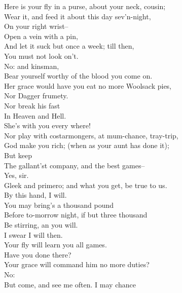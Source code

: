 \documentclass{memoir}
\begin{document}
\begin{drama*}
 Here is your fly in a purse, about your neck, cousin;\\
 Wear it, and feed it about this day sev'n-night,\\
 On your right wrist--\\
\subtlespeaks {} Open a vein with a pin,\\
 And let it suck but once a week; till then,\\
 You must not look on't.\\
\dolspeaks {} No: and kinsman,\\
 Bear yourself worthy of the blood you come on.\\
\subtlespeaks  Her grace would have you eat no more Woolsack pies,\\
 Nor Dagger frumety.\\
\dolspeaks {} Nor break his fast\\
 In Heaven and Hell.\\
\subtlespeaks {} She's with you every where!\\
 Nor play with costarmongers, at mum-chance, tray-trip,\\
 God make you rich; (when as your aunt has done it);\\
 But keep\\
 The gallant'st company, and the best games--\\
\dapperspeaks  Yes, sir.\\
\subtlespeaks {} Gleek and primero; and what you get, be true to us.\\
\dapperspeaks  By this hand, I will.\\
\subtlespeaks {} You may bring's a thousand pound\\
 Before to-morrow night, if but three thousand\\
 Be stirring, an you will.\\
\dapperspeaks {} I swear I will then.\\
\subtlespeaks  Your fly will learn you all games.\\
\facespeaks {} Have you done there?\\
\subtlespeaks {} Your grace will command him no more duties?\\
\dolspeaks  No:\\
 But come, and see me often. I may chance\\

\end{drama*}
\end{document}
